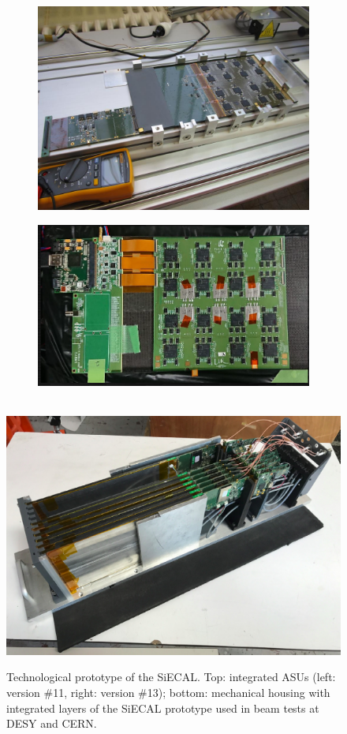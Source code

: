 \begin{figure}[t!]
\centering
\begin{subfigure}{0.45\textwidth}
\includegraphics[width=0.9\hsize]{Detector/fig/siwecal-fev12.jpg}
\end{subfigure}
\begin{subfigure}{0.45\textwidth}
\includegraphics[width=1.1\hsize]{Detector/fig/siwecal-fev13.png}
\end{subfigure} \\ 
\includegraphics[width=0.50\hsize]{Detector/fig/siwecal-tp.png}
\caption{Technological prototype of the SiECAL. Top: integrated ASUs (left: version \#11, right: version \#13); bottom: mechanical housing with integrated layers of the SiECAL prototype used in beam tests at DESY and CERN.}
\label{fig:det:SiWECAL_proto}
\end{figure}



